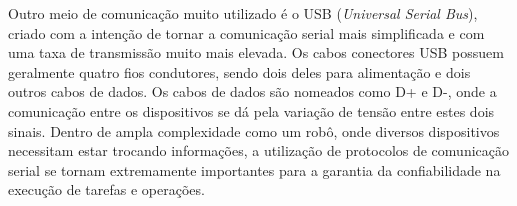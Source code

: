 Outro meio de comunicação muito utilizado é o USB (\textit{Universal Serial Bus}), criado com a intenção de tornar a comunicação serial mais simplificada e com uma taxa de transmissão muito mais elevada. Os cabos conectores USB possuem geralmente quatro fios condutores, sendo dois deles para alimentação e dois outros cabos de dados. Os cabos de dados são nomeados como D+ e D-, onde a comunicação entre os dispositivos se dá pela variação de tensão entre estes dois sinais.
Dentro de ampla complexidade como um robô, onde diversos dispositivos necessitam estar trocando informações, a utilização de protocolos de comunicação serial se tornam extremamente importantes para a garantia da confiabilidade na execução de tarefas e operações.
